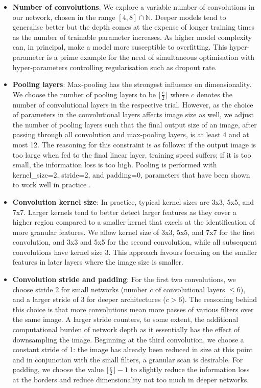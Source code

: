 \documentclass[british,12p]{article}
\begin{document}
    
    \begin{itemize}
    	\item \textbf{Number of convolutions}. We explore a variable number of convolutions in our network, chosen  in the range $[4, 8] \cap \mathbb{N}$. Deeper models tend to generalise better but the depth comes at the expense of longer training times as the number of trainable parameter increases. As higher model complexity can, in principal, make a model more susceptible to overfitting. This hyper-parameter is a prime example for the need of simultaneous optimisation with hyper-parameters controlling regularisation such as dropout rate.
    	\item \textbf{Pooling layers}: Max-pooling has the strongest influence on dimensionality. We choose the number of pooling layers to be $\lfloor \frac{c}{2}\rfloor$ where $c$ denotes the number of convolutional layers in the respective trial. However, as the choice of parameters in the convolutional layers affects image size as well, we adjust the number of pooling layers such that the final output size of an image, after passing through all convolution and max-pooling layers, is at least 4 and at most 12. The reasoning for this constraint is as follows: if the output image is too large when fed to the final linear layer, training speed suffers; if it is too small, the information loss is too high. Pooling is performed with kernel\_size=2, stride=2, and padding=0, parameters that have been shown to work well in practice \cite[p. 99]{buduma:17}.
    	\item \textbf{Convolution kernel size}: In practice, typical kernel sizes are 3x3, 5x5, and 7x7. Larger kernels tend to better detect larger features as they cover a higher region compared to a smaller kernel that excels at the identification of more granular features. We allow kernel size of 3x3, 5x5, and 7x7 for the first convolution, and 3x3 and 5x5 for the second convolution, while all subsequent convolutions have kernel size 3. This approach favours focusing on the smaller features in later layers where the image size is smaller.  
    	\item \textbf{Convolution stride and padding}: For the first two convolutions, we choose stride 2 for small networks (number $c$ of convolutional layers $\le 6$), and a larger stride of 3 for deeper architectures ($c > 6$). The reasoning behind this choice is that more convolutions mean more passes of various filters over the same image. A larger stride counters, to some extent, the additional computational burden of network depth as it essentially has the effect of downsampling the image. Beginning at the third convolution, we choose a constant stride of 1: the image has already been reduced in size at this point and in conjunction with the small filters, a granular scan is desirable. For padding, we choose the value $\lfloor \frac{c}{2}\rfloor - 1$ to slightly reduce the information loss at the borders and reduce dimensionality not too much in deeper networks. 

\end{itemize}
\end{document}
